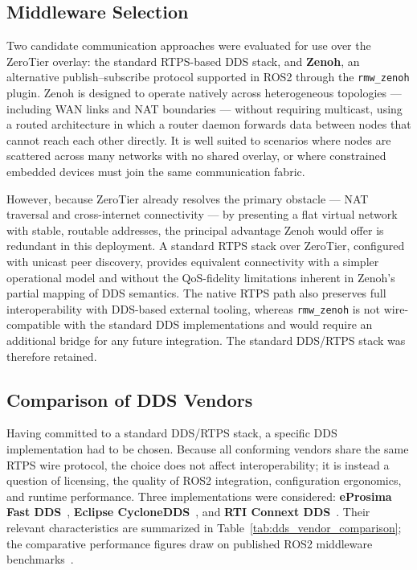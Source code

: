 \subsection{Middleware Selection}

Two candidate communication approaches were evaluated for use over the ZeroTier overlay: the standard RTPS-based DDS stack, and \textbf{Zenoh}, an alternative publish--subscribe protocol supported in ROS2 through the \texttt{rmw\_zenoh} plugin. Zenoh is designed to operate natively across heterogeneous topologies --- including WAN links and NAT boundaries --- without requiring multicast, using a routed architecture in which a router daemon forwards data between nodes that cannot reach each other directly. It is well suited to scenarios where nodes are scattered across many networks with no shared overlay, or where constrained embedded devices must join the same communication fabric.

However, because ZeroTier already resolves the primary obstacle --- NAT traversal and cross-internet connectivity --- by presenting a flat virtual network with stable, routable addresses, the principal advantage Zenoh would offer is redundant in this deployment. A standard RTPS stack over ZeroTier, configured with unicast peer discovery, provides equivalent connectivity with a simpler operational model and without the QoS-fidelity limitations inherent in Zenoh's partial mapping of DDS semantics. The native RTPS path also preserves full interoperability with DDS-based external tooling, whereas \texttt{rmw\_zenoh} is not wire-compatible with the standard DDS implementations and would require an additional bridge for any future integration. The standard DDS/RTPS stack was therefore retained.

\subsection{Comparison of DDS Vendors}

Having committed to a standard DDS/RTPS stack, a specific DDS implementation had to be chosen. Because all conforming vendors share the same RTPS wire protocol, the choice does not affect interoperability; it is instead a question of licensing, the quality of ROS2 integration, configuration ergonomics, and runtime performance. Three implementations were considered: \textbf{eProsima Fast DDS}~\cite{eprosima_fastdds}, \textbf{Eclipse CycloneDDS}~\cite{eclipse_cyclonedds}, and \textbf{RTI Connext DDS}~\cite{rti_connext}. Their relevant characteristics are summarized in Table~\ref{tab:dds_vendor_comparison}; the comparative performance figures draw on published ROS2 middleware benchmarks~\cite{maruyama2016ros2,kronauer2021latency}.

